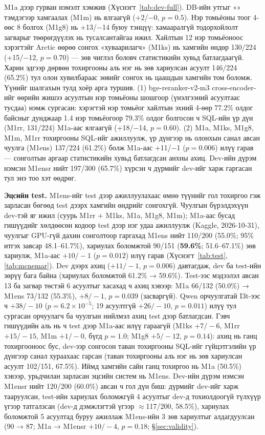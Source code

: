 M1a дээр гурван нэмэлт хэмжив (Хүснэгт~\ref{tab:dev-full}). DB-ийн утгыг «» тэмдэгээр хамгаалах (M1m) нь ялгаагүй (+2/$-$0,
$p = 0.5$). Нэр томьёоны тоог 4-өөс 8 болгох (M1g8) нь +13/$-$14 буюу тэнцүү: хамааралгүй тодорхойлолт загварыг төөрөгдүүлэх
нь тусалсантайгаа ижил. Хайлтын 12 нэр томьёоноос хэрэгтэйг Arctic өөрөө сонгох «хуваарилагч» (M1ks) нь хамгийн өндөр 130/224
(+15/$-$12, $p = 0.70$) — зөв чиглэл боловч статистикийн хувьд батлагдаагүй. Харин эдгээр дөрвөн тохиргооны аль нэг нь зөв
хариулсан асуулт 146/224 (65.2\%) тул олон хувилбараас зөвийг сонгох нь цаашдын хамгийн том боломж.
Үүнийг шалгахын тулд хоёр арга туршив. (1) bge-reranker-v2-m3 cross-encoder-ийг өөрийн жишээ асуултын нэр томьёоны
шошгоор (үнэлгээний асуултаас тусдаа) нэмж сургасан: хэрэгтэй нэр томьёог хайлтын эхний 4-өөр 77.2\% олдог байсныг дунджаар
1.4 нэр томьёогоор 79.3\% олдог болгосон ч SQL-ийн үр дүн (M1rr, 131/224) M1a-аас ялгаагүй (+18/$-$14, $p = 0.60$).
(2) M1a, M1ks, M1g8, M1m, M1rr тохиргооны SQL-ийг ажиллуулж, үр дүнгээр нь олонхын санал авсан чуулга (M1ens) 137/224
(61.2\%) болж M1a-аас +11/$-$1 ($p = 0.006$) илүү гарав — сонголтын аргаар статистикийн хувьд батлагдсан анхны ахиц.
Dev-ийн дүрэм нэмсэн M1ensr нийт 197/300 (65.7\%) хүрсэн ч дүрмийг dev-ийг харж гаргасан тул энэ тоо хэт өөдрөг.

\textbf{Эцсийн test.}\label{sec:final-test} M1ens-ийг test дээр ажиллуулахаас өмнө түүнийг гол тохиргоо гэж зарласан
бөгөөд test дээрх хамгийн өндрийг сонгохгүй. Чуулгын бүрэлдэхүүн dev-тэй яг ижил (суурь M1rr + M1ks, M1a, M1g8, M1m); M1a-аас бусад
гишүүдийг хөлдөөсөн кодоор test дээр нэг удаа ажиллуулж (Kaggle, 2026-10-31), чуулгыг GPU-гүй дахин сонголтоор гаргахад
M1ens нийт 110/200 (55.0\%; 95\% итгэх завсар 48.1--61.7\%), хариулах боломжтой 90/151 (\textbf{59.6\%}; 51.6--67.1\%) зөв
хариулж, M1a-аас $+10/-1$ ($p = 0.012$) илүү гарав (Хүснэгт~\ref{tab:test}, \ref{tab:mcnemar}). Dev дээрх ахиц ($+11/-1$,
$p = 0.006$) давтагдаж, dev ба test-ийн зөрүү бага байна (хариулах боломжтой 61.2\% → 59.6\%). Test-ээс мэдээлэл авсан 13 ба
загвар төстэй 6 асуултыг хасахад ч ахиц хэвээр: M1a 66/132 (50.0\%) → M1ens 73/132 (55.3\%), $+8/-1$, $p = 0.039$
(засваргүй). Qwen орчуулгатай I3t-ээс ч $+38/-10$ ($p = 6.2\times10^{-5}$; 19 асуултгүй $+26/-10$, $p = 0.011$) илүү тул
сургасан орчуулагч ба чуулгын нийлмэл ахиц test дээр батлагдсан. Гэвч гишүүдийн аль нь ч test дээр M1a-аас илүү гараагүй
(M1ks $+7/-6$, M1rr $+15/-15$, M1m $+1/-0$, бүгд $p = 1.0$; M1g8 $+5/-12$, $p = 0.14$): ахиц нь ганц тохиргооноос бус,
dev-ээр сонгосон таван тохиргооны SQL-ийг гүйцэтгэлийн үр дүнгээр санал хураахаас гарсан (таван тохиргооны аль нэг нь зөв
хариулсан асуулт 102/151, 67.5\%). Иймд хамгийн сайн ганц тохиргоо нь M1a (50.5\%) хэвээр, урьдчилан зарласан эцсийн систем
нь M1ens. Dev-ийн дүрэм нэмсэн M1ensr нийт 120/200 (60.0\%) авсан ч гол дүн биш: дүрмийг dev-ийг харж тааруулсан, test-ийн
хариулах боломжгүй 4 асуултыг dev-д тохиолдоогүй түлхүүр үгээр татгалзсан (dev-д дэмжлэгтэй үгээр $\approx$117/200,
58.5\%), хариулах боломжтой 5 асуултад буруу ажиллаж M1ens-ийн 3 зөв хариултыг алдагдуулсан (90 → 87; M1a → M1ensr
$+10/-4$, $p = 0.18$; §\ref{sec:validity}).

